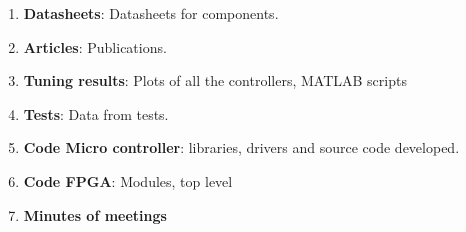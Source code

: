 \documentclass[../../main.tex]{subfiles}
\begin{document}
\begin{enumerate}
    \item \textbf{Datasheets}: Datasheets for components.
    \item \textbf{Articles}: Publications.
    \item \textbf{Tuning results}: Plots of all the controllers, MATLAB scripts
    \item \textbf{Tests}: Data from tests.
    \item \textbf{Code Micro controller}: libraries, drivers and source code developed.
    \item \textbf{Code FPGA}: Modules, top level
    \item \textbf{Minutes of meetings}
\end{enumerate}        
\end{document}
